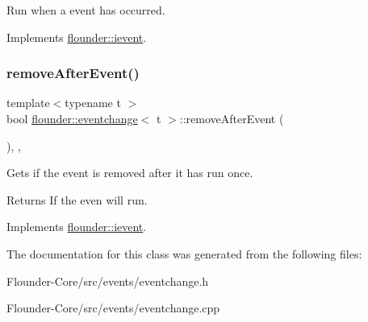 Run when a event has occurred. 



Implements \hyperlink{classflounder_1_1ievent_a6c6abe67435870b25eccd57a251a8992}{flounder\+::ievent}.

\mbox{\label{classflounder_1_1eventchange_ab3d476ecb51140e93886dc320ee44c33}} 
\subsubsection{\texorpdfstring{remove\+After\+Event()}{removeAfterEvent()}}
{\footnotesize\ttfamily template$<$typename t $>$ \\
bool \hyperlink{classflounder_1_1eventchange}{flounder\+::eventchange}$<$ t $>$\+::remove\+After\+Event (\begin{DoxyParamCaption}{ }\end{DoxyParamCaption})\hspace{0.3cm}{\ttfamily [inline]}, {\ttfamily [override]}, {\ttfamily [virtual]}}



Gets if the event is removed after it has run once. 

\begin{DoxyReturn}{Returns}
If the even will run. 
\end{DoxyReturn}


Implements \hyperlink{classflounder_1_1ievent_a7017c8803df2397758980cb61020e801}{flounder\+::ievent}.



The documentation for this class was generated from the following files\+:\begin{DoxyCompactItemize}
\item 
Flounder-\/\+Core/src/events/eventchange.\+h\item 
Flounder-\/\+Core/src/events/eventchange.\+cpp\end{DoxyCompactItemize}
